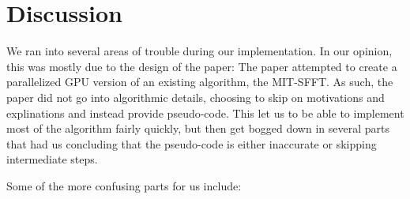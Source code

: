 
\section{Discussion}

We ran into several areas of trouble during our implementation. In our opinion, this was mostly due to the design of the paper: The paper attempted to create a parallelized GPU version of an existing algorithm, the MIT-SFFT. As such, the paper did not go into algorithmic details, choosing to skip on motivations and explinations and instead provide pseudo-code. This let us to be able to implement most of the algorithm fairly quickly, but then get bogged down in several parts that had us concluding that the pseudo-code is either inaccurate or skipping intermediate steps. 

Some of the more confusing parts for us include:

